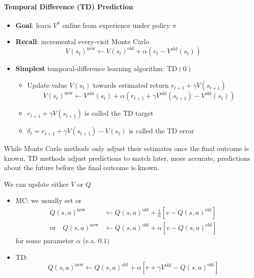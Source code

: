 \paragraph{Temporal Difference (TD) Prediction}
\begin{itemize}
    \item \textbf{Goal}: learn $V^{\pi}$ online from experience under policy $\pi$
    \item \textbf{Recall}: incremental every-visit Monte Carlo
    \[
    V(s_{t})^{\text{new}} \leftarrow V(s_{t})^{\text{old}}+\alpha(v_{t}-V^{\text{old}}(s_{t}))
    \]
    \item \textbf{Simplest} temporal-difference learning algorithm: $\mathrm{TD}(0)$
    \begin{itemize}
        \item Update value $V(s_{t})$ towards estimated return $r_{t+1}+\gamma V(s_{t+1})$
        \[
        V(s_{t})^{\text{new}}\leftarrow V^{\text{old}}(s_{t})+\alpha(r_{t+1}+\gamma V^{\text{old}}(s_{t+1})-V^{\text{old}}(s_{t}))
        \]
        \item $r_{t+1}+\gamma V(s_{t+1})$ is called the TD target
        \item $\delta_{t}=r_{t+1}+\gamma V(s_{t+1})-V(s_{t})$ is called the TD error
    \end{itemize}
\end{itemize}

While Monte Carlo methods only adjust their estimates once the final outcome is known, TD methods adjust predictions to match later, more accurate, predictions about the future before the final outcome is known.

We can update either $V$ or $Q$

\begin{itemize}
    \item MC: we usually set
    or
    \begin{align*}
      Q(s, a)^{\text{new}}&\leftarrow Q(s, a)^{\text{old}}+\frac{1}{n}[v-Q(s, a)^{\text{old}}] \\
      \text{or}\quad Q(s, a)^{\text{new}}&\leftarrow Q(s, a)^{\text{old}}+\alpha[v-Q(s, a)^{\text{old}}]
    \end{align*}
    for some parameter $\alpha$ (e.a. $0.1)$
    \item TD:
\[
Q(s, a)^{\text{new}}\leftarrow Q(s, a)^{\text{old}}+\alpha[r+\gamma V^{\text{old}}-Q(s, a)^{\text{old}}]
\]
\end{itemize}

